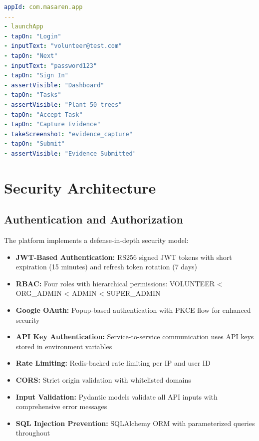 \begin{lstlisting}[language=yaml, caption=Mobile E2E Flow]
appId: com.masaren.app
---
- launchApp
- tapOn: "Login"
- inputText: "volunteer@test.com"
- tapOn: "Next"
- inputText: "password123"
- tapOn: "Sign In"
- assertVisible: "Dashboard"
- tapOn: "Tasks"
- assertVisible: "Plant 50 trees"
- tapOn: "Accept Task"
- tapOn: "Capture Evidence"
- takeScreenshot: "evidence_capture"
- tapOn: "Submit"
- assertVisible: "Evidence Submitted"
\end{lstlisting}

\clearpage

\section{Security Architecture}

\subsection{Authentication and Authorization}

The platform implements a defense-in-depth security model:

\begin{itemize}
  \item \textbf{JWT-Based Authentication:} RS256 signed JWT tokens with short expiration (15 minutes) and refresh token rotation (7 days)
  \item \textbf{RBAC:} Four roles with hierarchical permissions: VOLUNTEER < ORG\_ADMIN < ADMIN < SUPER\_ADMIN
  \item \textbf{Google OAuth:} Popup-based authentication with PKCE flow for enhanced security
  \item \textbf{API Key Authentication:} Service-to-service communication uses API keys stored in environment variables
  \item \textbf{Rate Limiting:} Redis-backed rate limiting per IP and user ID
  \item \textbf{CORS:} Strict origin validation with whitelisted domains
  \item \textbf{Input Validation:} Pydantic models validate all API inputs with comprehensive error messages
  \item \textbf{SQL Injection Prevention:} SQLAlchemy ORM with parameterized queries throughout
\end{itemize}

